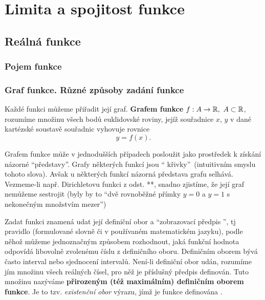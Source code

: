 \chapter{Limita a spojitost funkce}\label{MA1:chap_Limita}
\minitoc
\newpage
  \section{Reálná funkce}
    \subsection{Pojem funkce}
    \subsection{Graf funkce. Různé způsoby zadání funkce}
      Každé funkci můžeme přiřadit její graf. 
      \textbf{Grafem funkce} $f:A\rightarrow\realset,\ A\subset\realset$, rozumíme množinu všech bodů 
      euklidovské roviny, jejíž souřadnice $x$, $y$ v dané kartézské soustavě souřadnic vyhovuje rovnice 
      \begin{equation}\label{MAI:eq_graf04}
        y=f(x). 
      \end{equation}  
      
      Grafem funkce může v jednodušších případech posloužit jako prostředek k získání názorné       
      \textquotedblleft představy\textquotedblright. Grafy některých funkcí jsou \textquotedblleft 
      křivky\textquotedblright\, (intuitivním smyslu tohoto slova). Avšak u některých funkcí názorná 
      představa grafu selhává. Vezmeme-li např. Dirichletovu funkci z odst. **, snadno zjistíme, že její graf 
      nemůžeme sestrojit (byly by to \textquotedblleft dvě rovnoběžné přímky $y=0$ a $y=1$ s nekonečným 
      množstvím mezer\textquotedblright)
      
      Zadat funkci znamená udat její definiční obor a \textquotedblleft zobrazovací předpis 
      \textquotedblright, tj pravidlo (formulované slovně či v používaném matematickém jazyku), 
      podle něhož můžeme jednoznačným způsobem rozhodnout, jaká funkční hodnota odpovídá libovolně 
      zvolenému číslu z definičního oboru. Definičním oborem bývá často interval nebo sjednocení 
      intervalů. Není-li definiční obor udán, rozumíme jím množinu všech reálných čísel, pro něž je 
      příslušný předpis definován. Tuto množinu nazýváme \textbf{přirozeným (též maximálním) 
      definičním oborem funkce}. Je to tzv. \emph{existenční obor} výrazu, jímž je funkce definována 
      \cite[s.~84]{Brabec1989}.
      
